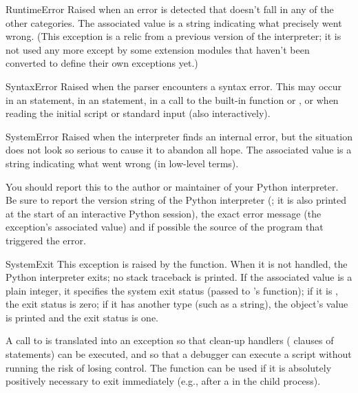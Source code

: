 \begin{excdesc}{RuntimeError}
  Raised when an error is detected that doesn't fall in any of the
  other categories.  The associated value is a string indicating what
  precisely went wrong.  (This exception is a relic from a previous
  version of the interpreter; it is not used any more except by some
  extension modules that haven't been converted to define their own
  exceptions yet.)
\end{excdesc}

\begin{excdesc}{SyntaxError}
  Raised when the parser encounters a syntax error.  This may occur in
  an  statement, in an  statement, in a call
  to the built-in function  or , or
  when reading the initial script or standard input (also
  interactively).
\end{excdesc}

\begin{excdesc}{SystemError}
  Raised when the interpreter finds an internal error, but the
  situation does not look so serious to cause it to abandon all hope.
  The associated value is a string indicating what went wrong (in
  low-level terms).
  
  You should report this to the author or maintainer of your Python
  interpreter.  Be sure to report the version string of the Python
  interpreter (; it is also printed at the start of an
  interactive Python session), the exact error message (the exception's
  associated value) and if possible the source of the program that
  triggered the error.
\end{excdesc}

\begin{excdesc}{SystemExit}
  This exception is raised by the  function.  When it
  is not handled, the Python interpreter exits; no stack traceback is
  printed.  If the associated value is a plain integer, it specifies the
  system exit status (passed to \C{}'s  function); if it is
  , the exit status is zero; if it has another type (such as
  a string), the object's value is printed and the exit status is one.
  
  A call to  is translated into an exception so that
  clean-up handlers ( clauses of  statements)
  can be executed, and so that a debugger can execute a script without
  running the risk of losing control.  The  function
  can be used if it is absolutely positively necessary to exit
  immediately (e.g., after a  in the child process).
\end{excdesc}

